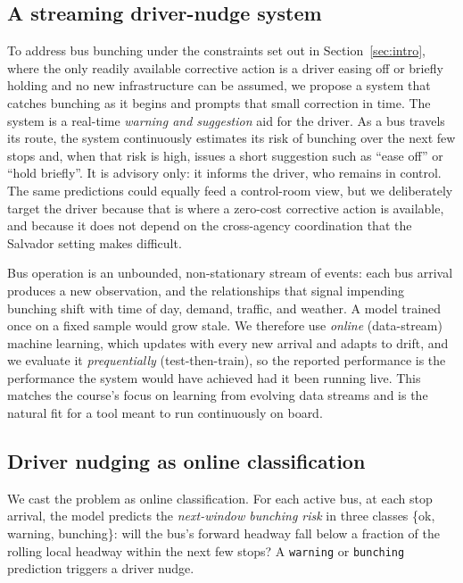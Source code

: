 \documentclass[final,5p,times,twocolumn,authoryear]{elsarticle}
\begin{document}
\subsection{A streaming driver-nudge system}
\label{sec:system}

To address bus bunching under the constraints set out in Section~\ref{sec:intro}, where the only
readily available corrective action is a driver easing off or briefly holding and no new
infrastructure can be assumed, we propose a system that catches bunching as it begins and prompts
that small correction in time. The system is a real-time \emph{warning and suggestion} aid for the
driver. As a bus travels its route, the system continuously estimates its risk of bunching over the
next few stops and, when that risk is high, issues a short suggestion such as ``ease off'' or ``hold
briefly''. It is advisory only: it informs the driver, who remains in control. The same predictions
could equally feed a control-room view, but we deliberately target the driver because that is where a
zero-cost corrective action is available, and because it does not depend on the cross-agency
coordination that the Salvador setting makes difficult.

Bus operation is an unbounded, non-stationary stream of events: each bus arrival produces a new
observation, and the relationships that signal impending bunching shift with time of day, demand,
traffic, and weather. A model trained once on a fixed sample would grow stale. We therefore use
\emph{online} (data-stream) machine learning, which updates with every new arrival and adapts to
drift, and we evaluate it \emph{prequentially} (test-then-train), so the reported performance is
the performance the system would have achieved had it been running live. This matches the course's
focus on learning from evolving data streams and is the natural fit for a tool meant to run
continuously on board.

\subsection{Driver nudging as online classification}
\label{sec:nudge-task}

We cast the problem as online classification. For each active bus, at each stop arrival, the model
predicts the \emph{next-window bunching risk} in three classes \{ok, warning, bunching\}: will the
bus's forward headway fall below a fraction of the rolling local headway within the next few stops?
A \texttt{warning} or \texttt{bunching} prediction triggers a driver nudge.
\end{document}
